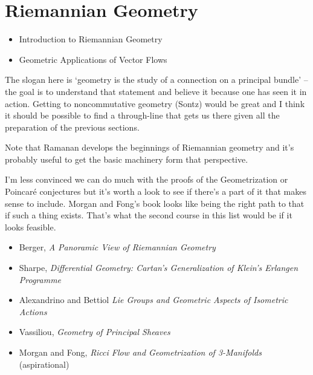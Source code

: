 \documentclass[article]{article}
\begin{document}
\section{Riemannian Geometry}

\begin{itemize}
	\item{Introduction to Riemannian Geometry}
	\item{Geometric Applications of Vector Flows}
\end{itemize}

The slogan here is `geometry is the study of a connection on a principal bundle' -- the goal is to understand that statement and believe it because one has seen it in action. Getting to noncommutative geometry (Sontz) would be great and I think it should be possible to find a through-line that gets us there given all the preparation of the previous sections. 

Note that Ramanan develops the beginnings of Riemannian geometry and it's probably useful to get the basic machinery form that perspective.

I'm less convinced we can do much with the proofs of the Geometrization or Poincar\'e conjectures but it's worth a look to see if there's a part of it that makes sense to include. Morgan and Fong's book looks like being the right path to that if such a thing exists. That's what the second course in this list would be if it looks feasible.

\begin{itemize}
	\item[]{Berger, \textit{A Panoramic View of Riemannian Geometry}}
	\item[]{Sharpe, \textit{Differential Geometry: Cartan's Generalization of Klein's Erlangen Programme}}
	\item{Alexandrino and Bettiol \textit{Lie Groups and Geometric Aspects of Isometric Actions}}
	\item[]{Vassiliou, \textit{Geometry of Principal Sheaves}}
	\item[]{Morgan and Fong, \textit{Ricci Flow and Geometrization of 3-Manifolds} (aspirational)}
\end{itemize}
\end{document}
